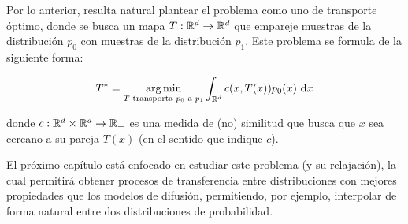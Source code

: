 Por lo anterior, resulta natural plantear el problema como uno de transporte óptimo, donde se busca un mapa $T:\mathbb{R}^d\to\mathbb{R}^d$ que empareje muestras de la distribución $p_0$ con muestras de la distribución $p_1$. Este problema se formula de la siguiente forma:

\begin{equation*}
    T^* = \operatorname*{arg\,min}_{T\text{ transporta $p_0$ a $p_1$}} \int_{\mathbb{R}^d} c(x,T(x)) p_0(x)\,\operatorname{d}\! x
\end{equation*}

donde $c:\mathbb{R}^d\times\mathbb{R}^d\to\mathbb{R}_+$ es una medida de (no) similitud que busca que $x$ sea cercano a su pareja $T(x)$ (en el sentido que indique $c$).

El próximo capítulo está enfocado en estudiar este problema (y su relajación), la cual permitirá obtener procesos de transferencia entre distribuciones con mejores propiedades que los modelos de difusión, permitiendo, por ejemplo, interpolar de forma natural entre dos distribuciones de probabilidad.